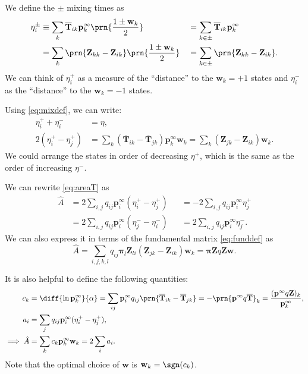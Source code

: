\documentclass[12pt]{article}
\newcommand{\eq}{\mathbf{p}^\infty}
\newcommand{\fpt}{\mathbf{T}}
\newcommand{\fptb}{\overline{\fpt}}
\newcommand{\fund}{\mathbf{Z}}
\newcommand{\pib}{\boldsymbol{\pi}}
\newcommand{\w}{\mathbf{w}}
\begin{document}
\begin{defn}
We define the $\pm$ mixing times as
%
\begin{equation}\label{eq:mixingpm}
\begin{aligned}
  \eta^\pm_i &\equiv \sum_k \fptb_{ik} \eq_k \prn{\frac{1 \pm \w_k}{2}}
    &&= \sum_{k\in\pm} \fptb_{ik} \eq_k \\
    &= \sum_k \prn{\fund_{kk}-\fund_{ik}} \prn{\frac{1 \pm \w_k}{2}}
    &&= \sum_{k\in\pm} \prn{\fund_{kk}-\fund_{ik}} .
\end{aligned}
\end{equation}
%
We can think of $\eta^+_i$ as a measure of the ``distance'' to the $\w_k=+1$ states and $\eta^-_i$ as the ``distance'' to the $\w_k=-1$ states.
\end{defn}
Using \eqref{eq:mixdef}, we can write:
%
\begin{equation}\label{eq:mixingrels}
\begin{aligned}
  \eta^+_i + \eta^-_i &= \eta,\\
  2(\eta^+_i - \eta^+_j) &= \sum_k (\fptb_{ik}-\fptb_{jk}) \eq_k \w_k
    = \sum_k (\fund_{jk}-\fund_{ik}) \w_k.
\end{aligned}
\end{equation}
%
We could arrange the states in order of decreasing $\eta^+$, which is the same as the order of increasing $\eta^-$.

We can rewrite \eqref{eq:areaT} as
%
\begin{equation}\label{eq:areaEta}
\begin{aligned}
  \hat{A} &= 2\sum_{i,j} q_{ij} \eq_i (\eta^+_{i} - \eta^+_{j}) &
    &= -2\sum_{i,j} q_{ij} \eq_i \eta^+_{j} \\
    &= 2\sum_{i,j} q_{ij} \eq_i (\eta^-_{j} - \eta^-_{i}) &
    &= 2\sum_{i,j} q_{ij} \eq_i \eta^-_{j}.
\end{aligned}
\end{equation}
%
We can also express it in terms of the fundamental matrix \eqref{eq:funddef} as
%
\begin{equation}\label{eq:areaZ}
  \hat{A} = \sum_{i,j,k,l} q_{ij} \pib_{l} \fund_{li} (\fund_{jk}-\fund_{ik}) \w_k
    = \pib \fund q \fund \w.
\end{equation}
%

It is also helpful to define the following quantities:
%
\begin{equation}\label{eq:areacoeffs}
  \begin{aligned}
    c_k &= \diff{\ln\eq_k}{\alpha}
      = \sum_{ij} \eq_i q_{ij} \prn{\fptb_{ik}-\fptb_{jk}}
      = - \prn{\eq q \fptb}_k
      = \frac{(\eq q \fund)_k}{\eq_k}, \\
    a_i &= \sum_j q_{ij} \eq_i (\eta^+_{i} - \eta^+_{j}),\\
    \implies
    \hat{A} &= \sum_k c_k \eq_k \w_k
      = 2\sum_i a_i.
  \end{aligned}
\end{equation}
%
Note that the optimal choice of $\w$ is $\w_k = \sgn(c_k)$.
\end{document}
